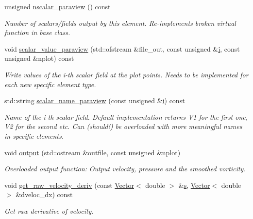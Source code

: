 \begin{DoxyCompactItemize}
unsigned \hyperlink{classoomph_1_1VorticitySmootherElement_a79746eb31ff493e2d43ce4465b57b22a}{nscalar\+\_\+paraview} () const
\begin{DoxyCompactList}\small\item\em Number of scalars/fields output by this element. Re-\/implements broken virtual function in base class. \end{DoxyCompactList}\item 
void \hyperlink{classoomph_1_1VorticitySmootherElement_a616f49cad0eaf25a0218730bda2f9b7f}{scalar\+\_\+value\+\_\+paraview} (std\+::ofstream \&file\+\_\+out, const unsigned \&\hyperlink{cfortran_8h_adb50e893b86b3e55e751a42eab3cba82}{i}, const unsigned \&nplot) const
\begin{DoxyCompactList}\small\item\em Write values of the i-\/th scalar field at the plot points. Needs to be implemented for each new specific element type. \end{DoxyCompactList}\item 
std\+::string \hyperlink{classoomph_1_1VorticitySmootherElement_af4f47bc30f0a157c2235c19243a88b0d}{scalar\+\_\+name\+\_\+paraview} (const unsigned \&\hyperlink{cfortran_8h_adb50e893b86b3e55e751a42eab3cba82}{i}) const
\begin{DoxyCompactList}\small\item\em Name of the i-\/th scalar field. Default implementation returns V1 for the first one, V2 for the second etc. Can (should!) be overloaded with more meaningful names in specific elements. \end{DoxyCompactList}\item 
void \hyperlink{classoomph_1_1VorticitySmootherElement_a981931bfa4139cd4d64ed427b65c95d9}{output} (std\+::ostream \&outfile, const unsigned \&nplot)
\begin{DoxyCompactList}\small\item\em Overloaded output function\+: Output velocity, pressure and the smoothed vorticity. \end{DoxyCompactList}\item 
void \hyperlink{classoomph_1_1VorticitySmootherElement_a84d1f43fd70f0c44c009bdb971e12cf7}{get\+\_\+raw\+\_\+velocity\+\_\+deriv} (const \hyperlink{classoomph_1_1Vector}{Vector}$<$ double $>$ \&\hyperlink{cfortran_8h_ab7123126e4885ef647dd9c6e3807a21c}{s}, \hyperlink{classoomph_1_1Vector}{Vector}$<$ double $>$ \&dveloc\+\_\+dx) const
\begin{DoxyCompactList}\small\item\em Get raw derivative of velocity. \end{DoxyCompactList}\item 

\end{DoxyCompactItemize}
